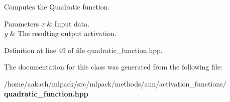 Computes the Quadratic function. 


\begin{DoxyParams}{Parameters}
{\em x} & Input data. \\
\hline
{\em y} & The resulting output activation. \\
\hline
\end{DoxyParams}


Definition at line 49 of file quadratic\+\_\+function.\+hpp.



The documentation for this class was generated from the following file\+:\begin{DoxyCompactItemize}
\item 
/home/aakash/mlpack/src/mlpack/methods/ann/activation\+\_\+functions/\textbf{ quadratic\+\_\+function.\+hpp}\end{DoxyCompactItemize}
